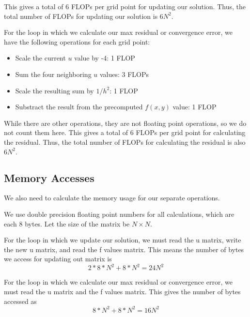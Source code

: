 \documentclass[11pt]{article}
\begin{document}
This gives a total of 6 FLOPs per grid point for updating our solution. Thus, the total number of FLOPs for updating our solution is \(6N^2\).

For the loop in which we calculate our max residual or convergence error, we have the following operations for each grid point:
\begin{itemize}
    \item Scale the current $u$ value by -4: 1 FLOP
    \item Sum the four neighboring $u$ values: 3 FLOPs
    \item Scale the resulting sum by \(1/h^2\): 1 FLOP
    \item Substract the result from the precomputed $f(x, y)$ value: 1 FLOP
\end{itemize}

While there are other operations, they are not floating point operations, so we do not count them here. This gives a total of 6 FLOPs per grid point for calculating the residual. Thus, the total number of FLOPs for calculating the residual is also \(6N^2\).

\subsection*{Memory Accesses}

We also need to calculate the memory usage for our separate operations. 

We use double precision floating point numbers for all calculations, which are each 8 bytes. Let the size of the matrix be $N \times N$.

For the loop in which we update our solution, we must read the u matrix, write the new u matrix, and read the f values matrix. This means the number of bytes we access for updating out matrix is
\[
    2 * 8 * N^2 + 8 * N^2 = 24N^2
\]

For the loop in which we calculate our max residual or convergence error, we must read the u matrix and the f values matrix. This gives the number of bytes accessed as
\[
    8 * N^2 + 8 * N^2 = 16N^2
\]
\end{document}
